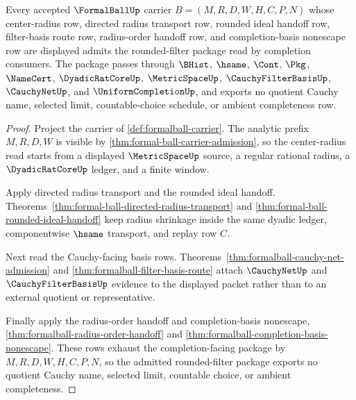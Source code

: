 \begin{theorem}
\label{thm:formal-ball-rounded-filter-admission-package}
Every accepted $\FormalBallUp$ carrier $B=(M,R,D,W,H,C,P,N)$ whose center-radius row, directed radius transport row, rounded ideal handoff row, filter-basis route row, radius-order handoff row, and completion-basis nonescape row are displayed admits the rounded-filter package read by completion consumers. The package passes through $\BHist$, $\hsame$, $\Cont$, $\Pkg$, $\NameCert$, $\DyadicRatCoreUp$, $\MetricSpaceUp$, $\CauchyFilterBasisUp$, $\CauchyNetUp$, and $\UniformCompletionUp$, and exports no quotient Cauchy name, selected limit, countable-choice schedule, or ambient completeness row.
\end{theorem}
\begin{proof}
Project the carrier of \autoref{def:formalball-carrier}. The analytic prefix $M,R,D,W$ is visible by \autoref{thm:formal-ball-carrier-admission}, so the center-radius read starts from a displayed $\MetricSpaceUp$ source, a regular rational radius, a $\DyadicRatCoreUp$ ledger, and a finite window.

Apply directed radius transport and the rounded ideal handoff. Theorems~\ref{thm:formal-ball-directed-radius-transport} and \ref{thm:formal-ball-rounded-ideal-handoff} keep radius shrinkage inside the same dyadic ledger, componentwise $\hsame$ transport, and replay row $C$.

Next read the Cauchy-facing basis rows. Theorems~\ref{thm:formalball-cauchy-net-admission} and \ref{thm:formalball-filter-basis-route} attach $\CauchyNetUp$ and $\CauchyFilterBasisUp$ evidence to the displayed packet rather than to an external quotient or representative.

Finally apply the radius-order handoff and completion-basis nonescape, \autoref{thm:formalball-radius-order-handoff} and \autoref{thm:formalball-completion-basis-nonescape}. These rows exhaust the completion-facing package by $M,R,D,W,H,C,P,N$, so the admitted rounded-filter package exports no quotient Cauchy name, selected limit, countable choice, or ambient completeness.
\end{proof}

